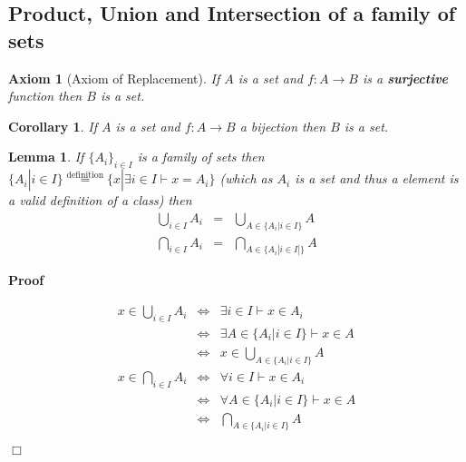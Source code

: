 \documentclass{book}
\newcommand{\equallim}{\mathop{=}\limits}
\newcommand{\nobracket}{}
\newcommand{\tmop}[1]{\ensuremath{\operatorname{#1}}}
\newcommand{\tmtextbf}[1]{{\bfseries{#1}}}
\newenvironment{proof}{\noindent\textbf{Proof\ }}{\hspace*{\fill}$\Box$\medskip}
\newtheorem{axiom}{Axiom}
\newtheorem{corollary}{Corollary}
\newtheorem{lemma}{Lemma}
\begin{document}
{{\subsection{Product, Union and Intersection of a family of sets}

\begin{axiom}[Axiom of Replacement]
  \label{axiom of replacements}{}If $A$ is a set
  and $f : A \rightarrow B$ is a \tmtextbf{surjective} function then $B$ is a
  set.
\end{axiom}

\begin{corollary}
  If $A$ is a set and $f : A \rightarrow B$ a bijection then $B$ is a set.
\end{corollary}

\begin{lemma}
  If $\{ A_i \}_{i \in I}$ is a family of sets then $\{ A_i | i \in I
  \nobracket \} \equallim^{\tmop{definition}} \{ x | \exists i \in I \vdash x
  = A_i \nobracket \}$ (which as $A_i$ is a set and thus a element is a valid
  definition of a class) then
  \begin{eqnarray*}
    \bigcup_{i \in I} A_i & = & \bigcup_{A \in \{ A_i | i \in I \nobracket \}}
    A\\
    \bigcap_{i \in I} A_i & = & \bigcap_{A \in \{ A_i | i \in I | \}} A
  \end{eqnarray*}
\end{lemma}

\begin{proof}
  
  \begin{eqnarray*}
    x \in \bigcup_{i \in I} A_i & \Leftrightarrow & \exists i \in I \vdash x
    \in A_i\\
    & \Leftrightarrow & \exists A \in \{ A_i | i \in I \nobracket \} \vdash x
    \in A\\
    & \Leftrightarrow & x \in \bigcup_{A \in \{ A_i | i \in I \nobracket \}}
    A\\
    x \in \bigcap_{i \in I} A_i & \Leftrightarrow & \forall i \in I \vdash x
    \in A_i\\
    & \Leftrightarrow & \forall A \in \{ A_i | i \in I \nobracket \} \vdash x
    \in A\\
    & \Leftrightarrow & \bigcap_{A \in \{ A_i | i \in I \nobracket \}} A
  \end{eqnarray*}
  
\end{proof}

}}
\end{document}
